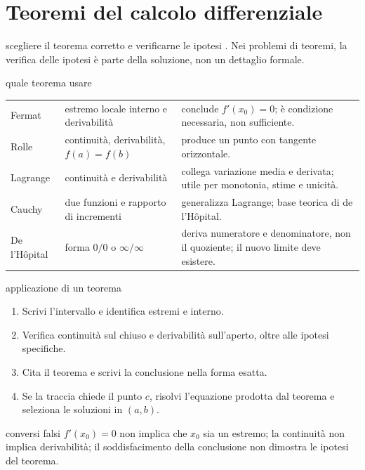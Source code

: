 \chapter{Teoremi del calcolo differenziale}
\label{chap:11}

\begin{obiettivocapitolo}{scegliere il teorema corretto e verificarne le ipotesi}
\prioritaalta. Nei problemi di teoremi, la verifica delle ipotesi è parte della soluzione, non un dettaglio formale.
\end{obiettivocapitolo}
\begin{sceltametodo}{quale teorema usare}
\begin{tabularx}{\textwidth}{@{}p{}p{}X@{}}
Fermat & estremo locale interno e derivabilità & conclude $f'(x_0)=0$; è condizione necessaria, non sufficiente.\\
Rolle & continuità, derivabilità, $f(a)=f(b)$ & produce un punto con tangente orizzontale.\\
Lagrange & continuità e derivabilità & collega variazione media e derivata; utile per monotonia, stime e unicità.\\
Cauchy & due funzioni e rapporto di incrementi & generalizza Lagrange; base teorica di de l'Hôpital.\\
De l'Hôpital & forma $0/0$ o $\infty/\infty$ & deriva numeratore e denominatore, non il quoziente; il nuovo limite deve esistere.
\end{tabularx}
\end{sceltametodo}
\begin{proceduraesame}{applicazione di un teorema}
\begin{enumerate}
\item Scrivi l'intervallo e identifica estremi e interno.
\item Verifica continuità sul chiuso e derivabilità sull'aperto, oltre alle ipotesi specifiche.
\item Cita il teorema e scrivi la conclusione nella forma esatta.
\item Se la traccia chiede il punto $c$, risolvi l'equazione prodotta dal teorema e seleziona le soluzioni in $(a,b)$.
\end{enumerate}
\end{proceduraesame}
\begin{errorefrequente}{conversi falsi}
$f'(x_0)=0$ non implica che $x_0$ sia un estremo; la continuità non implica derivabilità; il soddisfacimento della conclusione non dimostra le ipotesi del teorema.
\end{errorefrequente}

